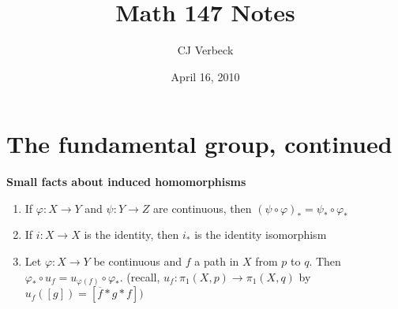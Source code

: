 \documentclass{article}
\renewcommand{\phi}{\varphi}
\theoremstyle{definition}
\begin{document}
\title{\vspace{-.1in} Math 147  Notes}  %
\author{CJ Verbeck}      %
\date{April 16, 2010}
\maketitle
\section{The fundamental group, continued}
\textbf{Small facts about induced homomorphisms}
\begin{enumerate}
	\item If $\phi: X\to Y$ and $\psi: Y\to Z$ are continuous, then $(\psi \circ \phi)_* = \psi_* \circ \phi_*$
	\item If $i:X\to X$ is the identity, then $i_*$ is the identity isomorphism
	\item Let $\phi:X\to Y$ be continuous and $f$ a path in $X$ from $p$ to $q$. Then $\phi_\ast \circ u_f = u_{\phi(f)}\circ \phi_*$. (recall, $u_f:\pi_1 (X,p) \to \pi_1(X,q)$ by $u_f([g]) = [\overline{f} \ast g \ast f ] )$
\end{enumerate}
\end{document}
